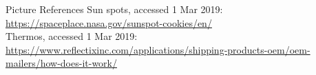 \documentclass{beamer}
\begin{document}
\begin{frame}{Picture References}
\tiny
Sun spots, accessed 1 Mar 2019: \href{https://spaceplace.nasa.gov/sunspot-cookies/en/}{https://spaceplace.nasa.gov/sunspot-cookies/en/}\\
Thermos, accessed 1 Mar 2019: \href{https://www.reflectixinc.com/applications/shipping-products-oem/oem-mailers/how-does-it-work/}{https://www.reflectixinc.com/applications/shipping-products-oem/oem-mailers/how-does-it-work/}\\
\end{frame}
\end{document}
